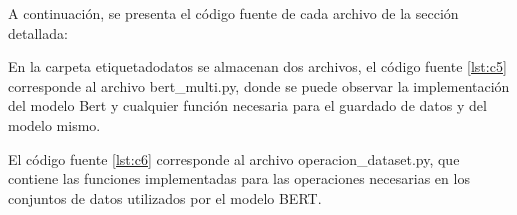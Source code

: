 A continuación, se presenta el código fuente de cada archivo de la sección detallada:


En la carpeta etiquetadodatos se almacenan dos archivos, el código fuente \ref{lst:c5} corresponde al archivo bert\_multi.py, donde se puede observar la implementación del modelo Bert y cualquier función necesaria para el guardado de datos y del modelo mismo.




El código fuente \ref{lst:c6} corresponde al archivo operacion\_dataset.py, que contiene las funciones implementadas para las operaciones necesarias en los conjuntos de datos utilizados por el modelo BERT.



